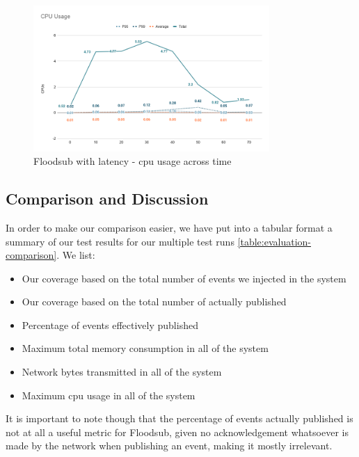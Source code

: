 \begin{figure}[!htb]
  \centering
  \includegraphics[width=0.8\textwidth]{img/graph-floodsub-cpu.png}
  \caption{Floodsub with latency - \acrshort{cpu} usage across time}
  \label{fig:graph-floodsub-latency-cpu}
\end{figure}

\subsection{Comparison and Discussion}\label{subsec:comparison}

In order to make our comparison easier, we have put into a tabular format a
summary of our test results for our multiple test runs
\ref{table:evaluation-comparison}. We list:

\begin{itemize}
  \item Our coverage based on the total number of events we injected in the
    system
  \item Our coverage based on the total number of actually published
  \item Percentage of events effectively published
  \item Maximum total memory consumption in all of the system
  \item Network bytes transmitted in all of the system
  \item Maximum \acrshort{cpu} usage in all of the system
\end{itemize}

It is important to note though that the percentage of events actually published
is not at all a useful metric for Floodsub, given no acknowledgement whatsoever
is made by the network when publishing an event, making it mostly irrelevant.

